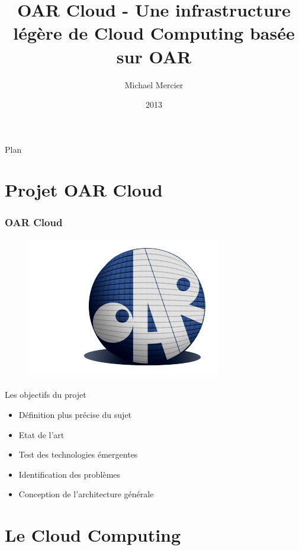 \documentclass{beamer}
\title[OAR Cloud]{OAR Cloud - Une infrastructure légère de Cloud Computing basée sur OAR}
\institute{Polytech Grenoble, INRIA\\\scalebox{2}{\insertlogo}}
\author{Michael Mercier}
\date{2013}
\begin{document}
	\begin{frame}
		\titlepage
	\end{frame}
	
	
	\begin{frame} 
		\begin{center}{\Large Plan }\end{center}
		\tableofcontents[hidesubsections]
	\end{frame}
	
	
  \section{Projet OAR Cloud}
		\begin{frame}
			\frametitle{OAR Cloud}
			\begin{figure}
			  \includegraphics[scale=0.3]{img/logo_oar.png}
 			\end{figure}
			Les objectifs du projet
			\begin{itemize}
			  \item Définition plus précise du sujet
			  \item Etat de l'art
			  \item Test des technologies émergentes
			  \item Identification des problèmes
			  \item Conception de l'architecture générale
			\end{itemize}			
		\end{frame}
			
			
			
	\section{Le Cloud Computing}
	
\end{document}

